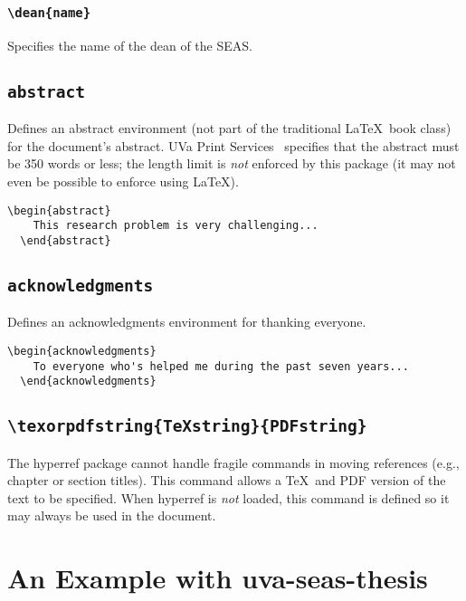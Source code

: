 \documentclass[10pt]{article}
\newcommand{\package}[1]{#1}
\newcommand{\environment}[1]{\texttt{#1}}
\newcommand{\command}[1]{\texttt{\textbackslash#1}}
\newcommand{\thispackage}{\package{uva-seas-thesis}}
\begin{document}
\subsubsection{\command{dean\{name\}}}
Specifies the name of the dean of the \gls{SEAS}.

\subsection{\environment{abstract}}
Defines an abstract environment (not part of the traditional \LaTeX\ book class) for the document's abstract.
\Gls{UVa} Print Services~\cite{uvaprint:thesis} specifies that the abstract must be 350 words or less;
the length limit is \emph{not} enforced by this package (it may not even be possible to enforce using \LaTeX).

\begin{lstlisting}[gobble=2,float=h]
  \begin{abstract}
    This research problem is very challenging...
  \end{abstract}
\end{lstlisting}

\subsection{\environment{acknowledgments}}
Defines an acknowledgments environment for thanking everyone.

\begin{lstlisting}[gobble=2,float=h]
  \begin{acknowledgments}
    To everyone who's helped me during the past seven years...
  \end{acknowledgments}
\end{lstlisting}

\subsection{\command{texorpdfstring\{\TeX string\}\{PDFstring\}}}
The \package{hyperref} package cannot handle fragile commands in moving references (e.g., chapter or section titles).
This command allows a \TeX\ and PDF version of the text to be specified.
When \package{hyperref} is \emph{not} loaded, this command is defined so it may always be used in the document.

\section{An Example with \thispackage}\label{section:example}
\end{document}
